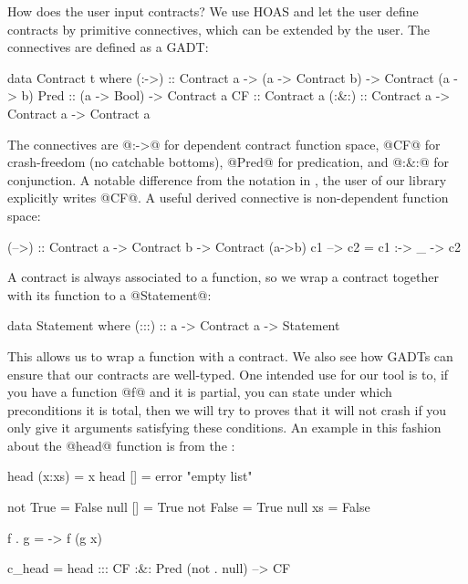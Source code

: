How does the user input contracts? We use HOAS and let the user define
contracts by primitive connectives, which can be extended by the user.
The connectives are defined as a GADT:

\begin{code}
data Contract t where
  (:->) :: Contract a -> (a -> Contract b) ->
           Contract (a -> b)
  Pred  :: (a -> Bool) -> Contract a
  CF    :: Contract a
  (:&:) :: Contract a -> Contract a -> Contract a
\end{code}

The connectives are @:->@ for dependent contract function space, @CF@
for crash-freedom (no catchable bottoms), @Pred@ for predication, and
@:&:@ for conjunction. A notable difference from the notation in
\cite{xu+:contracts}, the user of our library explicitly writes @CF@.
A useful derived connective is non-dependent function space:

\begin{code}
(-->) :: Contract a -> Contract b -> Contract (a->b)
c1 --> c2 = c1 :-> \_ -> c2
\end{code}

%
%

A contract is always associated to a function, so we wrap a contract
together with its function to a @Statement@:

\begin{code}
data Statement where
    (:::) :: a -> Contract a -> Statement
\end{code}

This allows us to wrap a function with a contract.  We also see how
GADTs can ensure that our contracts are well-typed.  One intended use
for our tool is to, if you have a function @f@ and it is partial, you
can state under which preconditions it is total, then we will try to
proves that it will not crash if you only give it arguments satisfying
these conditions. An example in this fashion about the @head@ function
is from the \cite{xu+:contracts}
:

\begin{code}
head (x:xs) = x
head []     = error "empty list"

not True = False    null [] = True
not False = True    null xs = False

f . g = \x -> f (g x)

c_head = head ::: CF :&: Pred (not . null) --> CF
\end{code}

